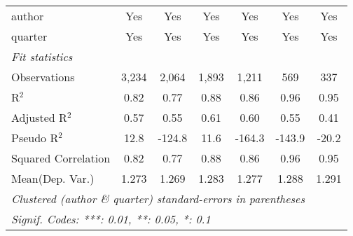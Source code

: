 \begin{tabular}{lcccccc}
   author                                                     & Yes           & Yes            & Yes            & Yes            & Yes          & Yes\\  
   quarter                                                    & Yes           & Yes            & Yes            & Yes            & Yes          & Yes\\  
   \midrule
   \emph{Fit statistics}\\
   Observations                                               & 3,234         & 2,064          & 1,893          & 1,211          & 569          & 337\\  
   R$^2$                                                      & 0.82          & 0.77           & 0.88           & 0.86           & 0.96         & 0.95\\  
   Adjusted R$^2$                                             & 0.57          & 0.55           & 0.61           & 0.60           & 0.55         & 0.41\\  
   Pseudo R$^2$                                               & 12.8          & -124.8         & 11.6           & -164.3         & -143.9       & -20.2\\  
   Squared Correlation                                        & 0.82          & 0.77           & 0.88           & 0.86           & 0.96         & 0.95\\  
Mean(Dep. Var.) & 1.273 & 1.269 & 1.283 & 1.277 & 1.288 & 1.291 \\
   \midrule \midrule
   \multicolumn{7}{l}{\emph{Clustered (author \& quarter) standard-errors in parentheses}}\\
   \multicolumn{7}{l}{\emph{Signif. Codes: ***: 0.01, **: 0.05, *: 0.1}}\\
\end{tabular}
\par\endgroup
